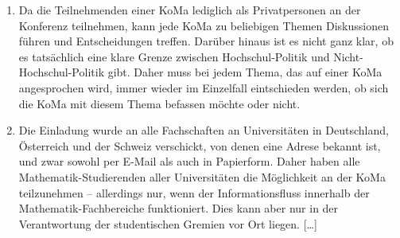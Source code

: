 \begin{enumerate}
\item Da die Teilnehmenden einer KoMa lediglich als Privatpersonen an der
	Konferenz teilnehmen, kann jede KoMa zu beliebigen Themen Diskussionen
	führen und Entscheidungen treffen. Darüber hinaus ist es nicht ganz
	klar, ob es tatsächlich eine klare Grenze zwischen Hochschul-Politik
	und Nicht-Hochschul-Politik gibt. Daher muss bei jedem Thema, das auf
	einer KoMa angesprochen wird, immer wieder im Einzelfall eintschieden
	werden, ob sich die KoMa mit diesem Thema befassen möchte oder nicht.

\item Die Einladung wurde an alle Fachschaften an Universitäten in
	Deutschland, Österreich und der Schweiz verschickt, von denen eine
	Adrese bekannt ist, und zwar sowohl per E-Mail als auch in Papierform.
	Daher haben alle Mathematik-Studierenden aller Universitäten die
	Möglichkeit an der KoMa teilzunehmen -- allerdings nur, wenn der
	Informationsfluss innerhalb der Mathematik-Fachbereiche funktioniert.
	Dies kann aber nur in der Verantwortung der studentischen Gremien vor
	Ort liegen.  [\dots]
\end{enumerate}
